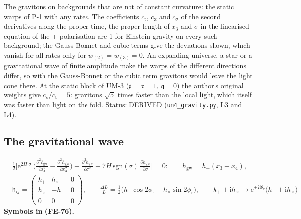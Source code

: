 \documentclass[
  10pt,
]{article}
\begin{document}
The gravitons on backgrounds that are not of constant curvature: the
static warps of P-1 with any rates. The coefficients \(c_{\mathrm{t}}\),
\(c_{\mathrm{x}}\) and \(c_\sigma\) of the second derivatives along the
proper time, the proper length of \(x_3\) and \(\sigma\) in the
linearised equation of the + polarisation are 1 for Einstein gravity on
every such background; the Gauss-Bonnet and cubic terms give the
deviations shown, which vanish for all rates only for
\(w_{(2)} = w_{(3)} = 0\). An expanding universe, a star or a
gravitational wave of finite amplitude make the warps of the different
directions differ, so with the Gauss-Bonnet or the cubic term gravitons
would leave the light cone there. At the static block of UM-3
(\(\mathfrak{p} = \mathfrak{r} = 1\), \(\mathfrak{q} = 0\)) the author's
original weights give \(c_{\mathrm{x}}/c_{\mathrm{t}} = 5\): gravitons
\(\sqrt5\) times faster than the local light, which itself was faster
than light on the fold. Status: DERIVED (\texttt{um4\_gravity.py}, L3
and L4).

\hypertarget{the-gravitational-wave}{%
\subsection{The gravitational wave}\label{the-gravitational-wave}}

\[
\begin{aligned}
&\frac12\Big[\mathrm{e}^{2H\lvert\sigma\rvert}\Big(\frac{\partial^2h_{\mathrm{gw}}}{\partial x_4^2} - \frac{\partial^2h_{\mathrm{gw}}}{\partial x_3^2}\Big)
 - \frac{\partial^2h_{\mathrm{gw}}}{\partial\sigma^2} + 7H\,\mathrm{sgn}(\sigma)\,\frac{\partial h_{\mathrm{gw}}}{\partial\sigma}\Big] = 0:\qquad
 h_{\mathrm{gw}} = h_{+}(x_3 - x_4),\\
&\mathsf{h}_{ij} = \begin{pmatrix} h_{+} & h_{\times} & 0\\ h_{\times} & -h_{+} & 0\\ 0 & 0 & 0\end{pmatrix},\qquad
 \frac{\Delta L}{L} = \frac12\big(h_{+}\cos2\phi_{\mathrm{r}} + h_{\times}\sin2\phi_{\mathrm{r}}\big),\qquad
 h_{+} \pm \mathrm{i}h_{\times} \to \mathrm{e}^{\mp2\mathrm{i}\theta_{\mathrm{r}}}\big(h_{+} \pm \mathrm{i}h_{\times}\big)
\end{aligned} \tag{FE-76}
\] \textbf{Symbols in (FE-76).}
\end{document}
